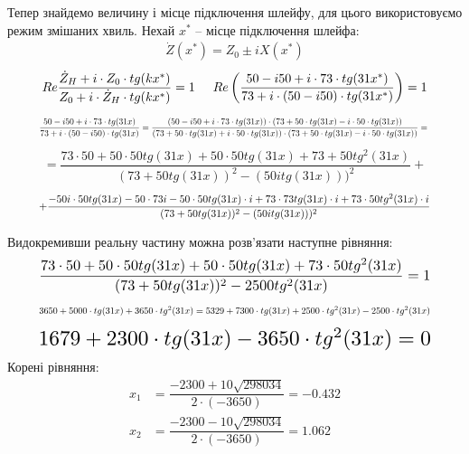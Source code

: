 \documentclass[a4paper,14pt]{extreport}
\begin{document}
Тепер знайдемо величину і місце підключення шлейфу, для цього використовуємо режим змішаних хвиль.
Нехай $x^*$ -- місце підключення шлейфа:
\begin{align}\label{eq15}
\dot{Z}(x^*) = Z_0 \pm iX(x^*)
\end{align}
\begin{align}\label{eq16}
Re\dfrac{\dot{Z}_H + i\cdot Z_0\cdot tg (kx^*)}{Z_0 + i\cdot \dot{Z}_H\cdot tg (kx^*)} = 1\hspace{0.5 cm}
Re\left(\dfrac{50-i50 + i\cdot 73\cdot tg (31x^*)}{73 + i\cdot (50-i50)\cdot tg (31x^*)}\right) = 1
\end{align}

\begin{align*}
\resizebox{.9\textwidth}{!}{%
$\dfrac{50-i50 + i\cdot 73\cdot tg (31x)}{73 + i\cdot (50-i50)\cdot tg (31x)} =
\dfrac{(50-i50 + i\cdot 73\cdot tg (31x))\cdot (73+50\cdot tg (31x)-i\cdot 50\cdot tg(31x))}{ (73+50\cdot tg (31x)+i\cdot 50\cdot tg(31x)) \cdot  (73+50\cdot tg (31x)-i\cdot 50\cdot tg(31x))} =$
}
\end{align*}
\begin{align*}
=\dfrac{73\cdot 50 + 50\cdot50tg(31x)+ 50\cdot50tg(31x)+ 73+50tg^2(31x)}{(73+50tg(31x))^2 - (50itg(31x)))^2} +
\end{align*}
\begin{align*}
\resizebox{.9\textwidth}{!}{%
$+ \dfrac{-50i\cdot50tg(31x) - 50 \cdot 73i-50\cdot50tg(31x)\cdot i + 73\cdot73tg(31x)\cdot i + 73\cdot50tg^2(31x)\cdot i}{(73+50tg(31x))^2 - (50itg(31x)))^2}$}
\end{align*}


Видокремивши реальну частину можна розв'язати наступне рівняння:
\begin{align*}
\resizebox{.9\textwidth}{!}{%
$ \dfrac{73\cdot 50 + 50\cdot50tg(31x) +50\cdot50tg(31x)+ 73\cdot50tg^2(31x) }{(73+50tg(31x))^2 - 2500tg^2(31x)} = 1$}
\end{align*}
\begin{align*}
\resizebox{.9\textwidth}{!}{%
$ 3650+ 5000\cdot tg(31x) + 3650\cdot tg^2(31x) = 5329 +7300 \cdot tg(31x) + 2500 \cdot tg^2(31x) -2500 \cdot tg^2(31x)$}
\end{align*}
\begin{align*}
\resizebox{.9\textwidth}{!}{%
$ 1679+2300\cdot tg(31x) - 3650\cdot tg^2(31x) =  0$}
\end{align*}
Корені рівняння:
\begin{align*}
 x_1& = \dfrac{-2300+10\sqrt{298034}}{2\cdot(-3650)} = -0.432\\
x_2 &= \dfrac{-2300-10\sqrt{298034}}{2\cdot(-3650)} = 1.062\\
\end{align*}
\newpage
\end{document}
